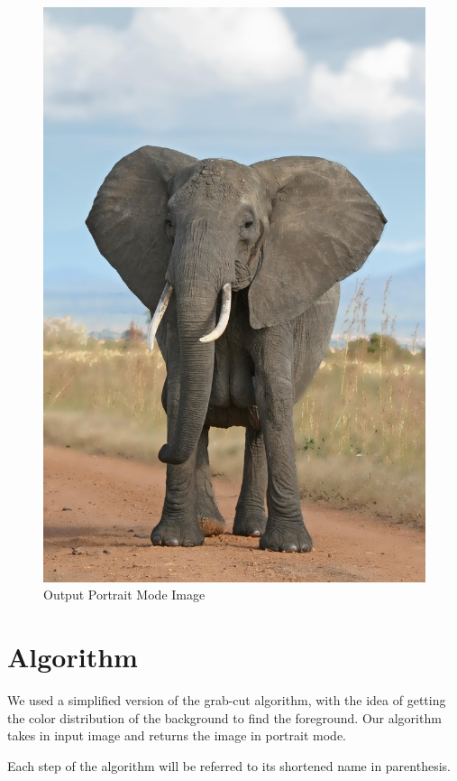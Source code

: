\documentclass[12pt]{article}
\begin{document}
\begin{figure}[!htb]
\begin{minipage}{0.48\textwidth}
        \includegraphics[width=0.9\linewidth]{large_elephant_portrait.jpg}
        \caption{Output Portrait Mode Image}
    \end{minipage}\hfill
\end{figure}

\section{Algorithm}

We used a simplified version of the grab-cut algorithm, with the idea of
getting the color distribution of the background to find the foreground. Our
algorithm takes in input image and returns the image in portrait mode.

Each step of the algorithm will be referred to its shortened name in
parenthesis.
\end{document}
